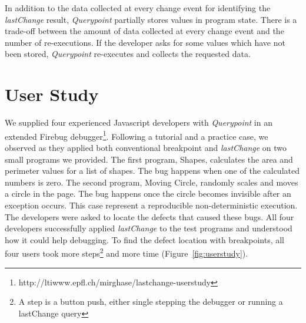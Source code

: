 \documentclass{sig-alternate}
\begin{document}
In addition to the data collected at every change event for identifying the \textit{lastChange}
result, \textit{Querypoint} partially stores values in program state. There is a trade-off between the amount of data collected at every change event and the number of re-executions. If the developer asks for some values which have not been stored, \textit{Querypoint} re-executes and collects the requested data. 


\section{User Study}
We supplied four experienced Javascript developers with \textit{Querypoint} in an 
extended Firebug debugger\footnote[1]{http://ltiwww.epfl.ch/\texttildelow mirghase/lastchange-userstudy}. Following a tutorial and a practice case, we observed as they 
applied both conventional breakpoint and \textit{lastChange} on two small programs we provided. The first program, Shapes, calculates the area and perimeter values for a list of shapes. The bug happens when one of the calculated numbers is zero. The second program, Moving Circle, randomly scales and moves a circle in the page. The bug happens once the circle becomes invisible after an exception occurs. This case represent a reproducible non-deterministic execution. The developers were asked to locate the defects that caused these bugs. All four developers successfully applied \textit{lastChange} to the test programs and understood how it could help debugging. To find the defect location with breakpoints, all four users took more steps\footnote[2]{A step is a button push, either single stepping the debugger or running a lastChange query} and more time (Figure~\ref{fig:userstudy}).    


\end{document}
